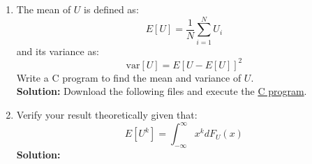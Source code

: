 \documentclass[journal,12pt,twocolumn]{IEEEtran}
\numberwithin{equation}{section}
\renewcommand\thesection{\arabic{section}}
\providecommand{\sbrak}[1]{\ensuremath{{}\left[#1\right]}}
\newcommand{\solution}{\noindent \textbf{Solution: }}
\providecommand{\link}[2]{{\color{blue}\href{https://github.com/SterbenVD/AI1110-Assignments/Assignment/#1}{#2}}}
\begin{document}
\begin{enumerate}[label=\thesection.\arabic*,ref=\thesection.\theenumi]
\solution
\\
\item
The mean of $U$ is defined as:
\begin{equation}
E\sbrak{U} = \frac{1}{N}\sum_{i=1}^{N}U_i
\end{equation}
and its variance as:
\begin{equation}
\text{var}\sbrak{U} = E\sbrak{U- E\sbrak{U}}^2 
\end{equation}
Write a C program to  find the mean and variance of $U$.
\\ 
\solution Download the following files and execute the \link{codes/1-3.c}{C program}.
\\
\item Verify your result theoretically given that:
\begin{equation}
E\sbrak{U^k} = \int_{-\infty}^{\infty}x^kdF_{U}(x)
\end{equation}
\solution
\end{enumerate}
\end{document}
